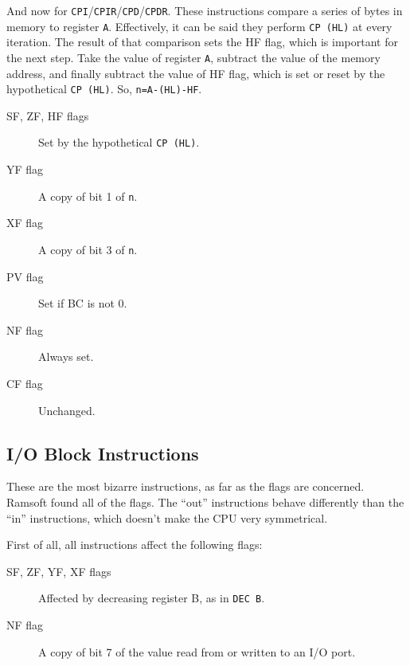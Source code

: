 And now for {\tt CPI}/{\tt CPIR}/{\tt CPD}/{\tt CPDR}. These instructions compare a series of bytes in memory to register {\tt A}. Effectively, it can be said they perform {\tt CP (HL)} at every iteration. The result of that comparison sets the HF flag, which is important for the next step. Take the value of register {\tt A}, subtract the value of the memory address, and finally subtract the value of HF flag, which is set or reset by the hypothetical {\tt CP (HL)}. So, {\tt n=A-(HL)-HF}.

\begin{description}

	\item[SF, ZF, HF flags]
	Set by the hypothetical {\tt CP (HL)}.

	\item[YF flag]
	A copy of bit 1 of {\tt n}.

	\item[XF flag]
	A copy of bit 3 of {\tt n}.

	\item[PV flag]
	Set if BC is not 0.

	\item[NF flag]
	Always set.

	\item[CF flag]
	Unchanged.

\end{description}


\subsection{I/O Block Instructions}
\label{block_io}

These are the most bizarre instructions, as far as the flags are concerned. Ramsoft found all of the flags. The ``out'' instructions behave differently than the ``in'' instructions, which doesn't make the CPU very symmetrical. 

First of all, all instructions affect the following flags:

\begin{description}

	\item[SF, ZF, YF, XF flags]
	Affected by decreasing register B, as in {\tt DEC B}.

	\item[NF flag]
	A copy of bit 7 of the value read from or written to an I/O port.

\end{description}

